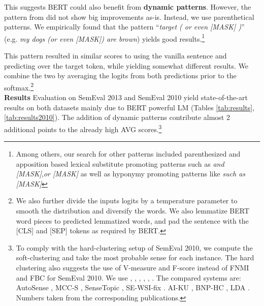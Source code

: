 \documentclass[11pt,a4paper]{article}
\begin{document}
This suggests BERT could also benefit from \textbf{dynamic patterns}. However,
the pattern from \citet{amrami2018word} did not show big improvements as-is. 
Instead, we use parenthetical
patterns. 
We empirically found that the pattern ``\emph{target ( or even [MASK] )}'' (e.g.
\emph{my dogs (or even [MASK]) are brown}) yields
good results.\footnote{Among others, our search for other patterns included parenthesized and apposition based lexical substitute promoting patterns such as \emph{and [MASK]},\emph{or [MASK]} as well as hyponymy promoting patterns like \emph{such as [MASK]}} 

This pattern resulted in similar scores to using the
vanilla sentence and predicting over the target token, while yielding somewhat
different results. We combine the two by averaging the logits from both
predictions prior to the softmax.\footnote{We also further divide the inputs
logits by a temperature parameter to smooth the distribution and diversify the
words. We also lemmatize BERT word pieces to predicted lemmatized words, and pad
the sentence with the [CLS] and [SEP] tokens as required by BERT.}
\\
\noindent\textbf{Results }
Evaluation on SemEval 2013 and SemEval 2010 yield 
state-of-the-art results on both datasets mainly due to BERT powerful LM (Tables \ref{tab:results},\ref{tab:results2010}). The addition of dynamic patterns contribute almost 2 additional points to the already
high AVG scores.\footnote{To comply with the hard-clustering setup of SemEval
2010, we compute the soft-clustering and take the most probable sense for each
instance. The hard clustering also suggests the use of V-measure and F-score
instead of FNMI and FBC for SemEval 2010. We use , ,
, , , . The compared systems
are: AutoSense \cite{hwang2019autosense}, 
MCC-S \cite{komninos2016structured}, 
SenseTopic \cite{wang2015sense}, 
SE-WSI-fix \cite{song2016word}.
AI-KU \cite{baskaya2013ai}
, BNP-HC \cite{teh2005sharing}
, LDA \cite{blei2003latent}. Numbers taken from the corresponding publications.}


\begin{table}[t!]
\centering
{}
\caption{Evaluation Results on the SemEval 2013 Task 13 Dataset. We report our mean (STD) scores over 10 runs. \textbf{ND}: no dynamic patterns. \textbf{ST(SW)}: Sense-Topic with embedding similarity weighting.
}
  \label{tab:results}
\end{table}
\end{document}
